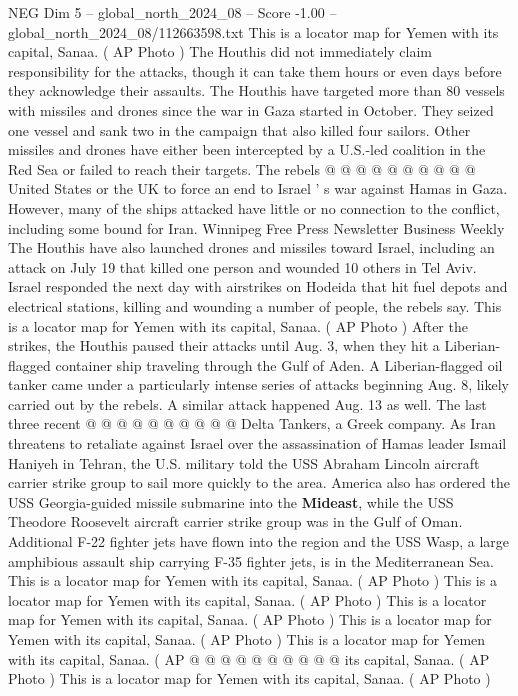 \begin{textsample}{NEG Dim 5 – global\_north\_2024\_08 – Score -1.00 – global\_north\_2024\_08/112663598.txt}
This is a locator map for Yemen with its capital, Sanaa. ( AP Photo ) The Houthis did not immediately claim responsibility for the attacks, though it can take them hours or even days before they acknowledge their assaults.
The Houthis have targeted more than 80 vessels with missiles and drones since the war in Gaza started in October.
They seized one vessel and sank two in the campaign that also killed four sailors.
Other missiles and drones have either been intercepted by a U.S.-led coalition in the Red Sea or failed to reach their targets.
The rebels @ @ @ @ @ @ @ @ @ @ United States or the UK to force an end to Israel ' s war against Hamas in Gaza.
However, many of the ships attacked have little or no connection to the conflict, including some bound for Iran.
Winnipeg Free Press Newsletter Business Weekly The Houthis have also launched drones and missiles toward Israel, including an attack on July 19 that killed one person and wounded 10 others in Tel Aviv.
Israel responded the next day with airstrikes on Hodeida that hit fuel depots and electrical stations, killing and wounding a number of people, the rebels say.
This is a locator map for Yemen with its capital, Sanaa. ( AP Photo ) After the strikes, the Houthis paused their attacks until Aug. 3, when they hit a Liberian-flagged container ship traveling through the Gulf of Aden.
A Liberian-flagged oil tanker came under a particularly intense series of attacks beginning Aug. 8, likely carried out by the rebels.
A similar attack happened Aug. 13 as well.
The last three recent @ @ @ @ @ @ @ @ @ @ Delta Tankers, a Greek company.
As Iran threatens to retaliate against Israel over the assassination of Hamas leader Ismail Haniyeh in Tehran, the U.S. military told the USS Abraham Lincoln aircraft carrier strike group to sail more quickly to the area.
America also has ordered the USS Georgia-guided missile submarine into the \textbf{Mideast}, while the USS Theodore Roosevelt aircraft carrier strike group was in the Gulf of Oman.
Additional F-22 fighter jets have flown into the region and the USS Wasp, a large amphibious assault ship carrying F-35 fighter jets, is in the Mediterranean Sea.
This is a locator map for Yemen with its capital, Sanaa. ( AP Photo ) This is a locator map for Yemen with its capital, Sanaa. ( AP Photo ) This is a locator map for Yemen with its capital, Sanaa. ( AP Photo ) This is a locator map for Yemen with its capital, Sanaa. ( AP Photo ) This is a locator map for Yemen with its capital, Sanaa. ( AP @ @ @ @ @ @ @ @ @ @ its capital, Sanaa. ( AP Photo ) This is a locator map for Yemen with its capital, Sanaa. ( AP Photo )

\end{textsample}

